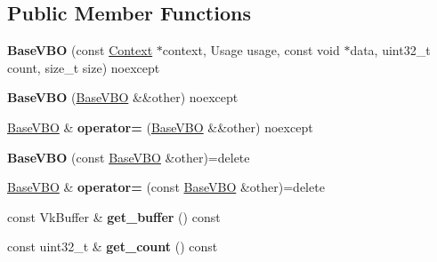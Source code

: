 \subsection*{Public Member Functions}
\begin{DoxyCompactItemize}
\item 
\mbox{\label{classblaze_1_1BaseVBO_a5eeef0c7e85c61eb41851047f8f98073}} 
{\bfseries Base\+V\+BO} (const \hyperlink{classblaze_1_1Context}{Context} $\ast$context, Usage usage, const void $\ast$data, uint32\+\_\+t count, size\+\_\+t size) noexcept
\item 
\mbox{\label{classblaze_1_1BaseVBO_a53edcf9bfcedf7f7b26d6d182f6f4f7e}} 
{\bfseries Base\+V\+BO} (\hyperlink{classblaze_1_1BaseVBO}{Base\+V\+BO} \&\&other) noexcept
\item 
\mbox{\label{classblaze_1_1BaseVBO_a91d5d339c3ef4e617a9fdf1dc9ebcb19}} 
\hyperlink{classblaze_1_1BaseVBO}{Base\+V\+BO} \& {\bfseries operator=} (\hyperlink{classblaze_1_1BaseVBO}{Base\+V\+BO} \&\&other) noexcept
\item 
\mbox{\label{classblaze_1_1BaseVBO_a502615b8e2aee286c9423fb44860010d}} 
{\bfseries Base\+V\+BO} (const \hyperlink{classblaze_1_1BaseVBO}{Base\+V\+BO} \&other)=delete
\item 
\mbox{\label{classblaze_1_1BaseVBO_ad33b69a6e7fe316547deb97561982d29}} 
\hyperlink{classblaze_1_1BaseVBO}{Base\+V\+BO} \& {\bfseries operator=} (const \hyperlink{classblaze_1_1BaseVBO}{Base\+V\+BO} \&other)=delete
\item 
\mbox{\label{classblaze_1_1BaseVBO_aebb08170aeb719ee90ea53cab50b5a9d}} 
const Vk\+Buffer \& {\bfseries get\+\_\+buffer} () const
\item 
\mbox{\label{classblaze_1_1BaseVBO_ad974bf5e5c5936770eecbaf9dd8e3c44}} 
const uint32\+\_\+t \& {\bfseries get\+\_\+count} () const
\end{DoxyCompactItemize}
